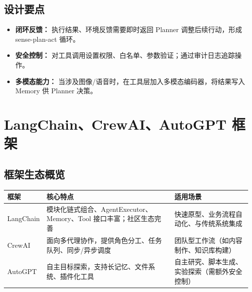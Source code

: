 \documentclass[UTF8,zihao=-4]{ctexart}
\begin{document}
\subsection{设计要点}
\begin{itemize}
  \item \textbf{闭环反馈：} 执行结果、环境反馈需要即时返回 Planner 调整后续行动，形成 sense-plan-act 循环。
  \item \textbf{安全控制：} 对工具调用设置权限、白名单、参数验证；通过审计日志追踪操作。
  \item \textbf{多模态能力：} 当涉及图像/语音时，在工具层加入多模态编码器，将结果写入 Memory 供 Planner 决策。
\end{itemize}

\section{LangChain、CrewAI、AutoGPT 框架}
\subsection{框架生态概览}
\begin{longtable}{p{3cm}p{4.5cm}p{6cm}}
\toprule
框架 & 核心特点 & 适用场景 \\
\midrule
LangChain & 模块化链式组合、AgentExecutor、Memory、Tool 接口丰富；社区生态完善 & 快速原型、业务流程自动化、与传统系统集成 \\
CrewAI & 面向多代理协作，提供角色分工、任务队列、同步/异步调度 & 团队型工作流（如内容制作、知识库构建） \\
AutoGPT & 自主目标探索，支持长记忆、文件系统、插件化工具 & 自主研究、脚本生成、实验探索（需额外安全控制） \\
\bottomrule
\end{longtable}
\end{document}
